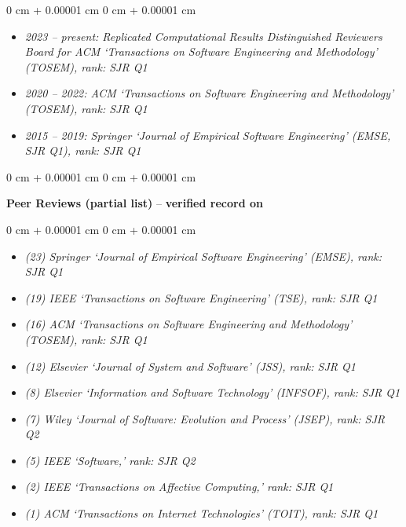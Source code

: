 \documentclass[10pt, a4paper]{article}
\newenvironment{highlights}{
    \begin{itemize}[
        topsep=0.10 cm,
        parsep=0.10 cm,
        partopsep=0pt,
        itemsep=0pt,
        leftmargin=0 cm + 10pt
    ]
}{
    \end{itemize}
} %
\newenvironment{onecolentry}{
    \begin{adjustwidth}{
        0 cm + 0.00001 cm
    }{
        0 cm + 0.00001 cm
    }
}{
    \end{adjustwidth}
} %
\let\hrefWithoutArrow\href
\renewcommand{\href}[2]{\hrefWithoutArrow{#1}{\ifthenelse{\equal{#2}{}}{ }{#2 }\raisebox{.15ex}{\footnotesize \faExternalLink*}}}
\begin{document}
        \vspace{0.10 cm}
        \begin{onecolentry}
            \begin{highlights}
                \item \textit{2023 – present: Replicated Computational Results Distinguished Reviewers Board for ACM `Transactions on Software Engineering and Methodology’ (TOSEM), rank: SJR Q1}
                \item \textit{2020 – 2022: ACM `Transactions on Software Engineering and Methodology’ (TOSEM), rank: SJR Q1}
                \item \textit{2015 – 2019: Springer ‘Journal of Empirical Software Engineering’ (EMSE, SJR Q1), rank: SJR Q1}
            \end{highlights}
        \end{onecolentry}


        \vspace{0.2 cm}

        \begin{onecolentry}
            \textbf{Peer Reviews (partial list)} -- \textbf{verified record on \href{https://www.webofscience.com/wos/author/record/H-4177-2014}{Clarivate}}\end{onecolentry}

        \vspace{0.10 cm}
        \begin{onecolentry}
            \begin{highlights}
                \item \textit{(23) Springer `Journal of Empirical Software Engineering' (EMSE), rank: SJR Q1}
                \item \textit{(19) IEEE `Transactions on Software Engineering' (TSE), rank: SJR Q1}
                \item \textit{(16) ACM `Transactions on Software Engineering and Methodology' (TOSEM), rank: SJR Q1}
                \item \textit{(12) Elsevier `Journal of System and Software' (JSS), rank: SJR Q1}
                \item \textit{(8) Elsevier `Information and Software Technology' (INFSOF), rank: SJR Q1}
                \item \textit{(7) Wiley `Journal of Software: Evolution and Process' (JSEP), rank: SJR Q2}
                \item \textit{(5) IEEE `Software,' rank: SJR Q2}
                \item \textit{(2) IEEE `Transactions on Affective Computing,' rank: SJR Q1}
                \item \textit{(1) ACM `Transactions on Internet Technologies' (TOIT), rank: SJR Q1}
            \end{highlights}
        \end{onecolentry}
\end{document}
